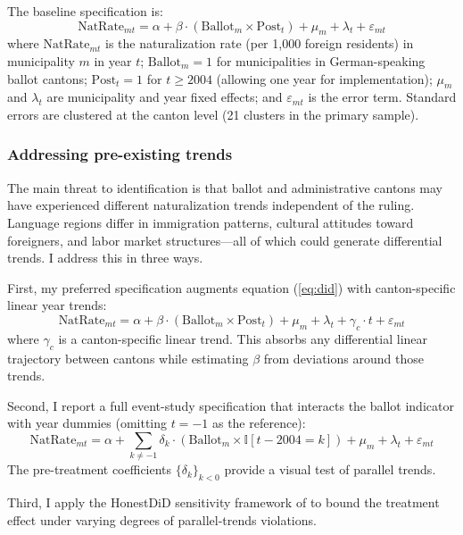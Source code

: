\documentclass[12pt]{article}
\newcommand{\ind}{\mathbb{I}}
\begin{document}
The baseline specification is:
\begin{equation}\label{eq:did}
\text{NatRate}_{mt} = \alpha + \beta \cdot (\text{Ballot}_m \times \text{Post}_t) + \mu_m + \lambda_t + \varepsilon_{mt}
\end{equation}
where $\text{NatRate}_{mt}$ is the naturalization rate (per 1,000 foreign residents) in municipality $m$ in year $t$; $\text{Ballot}_m = 1$ for municipalities in German-speaking ballot cantons; $\text{Post}_t = 1$ for $t \geq 2004$ (allowing one year for implementation); $\mu_m$ and $\lambda_t$ are municipality and year fixed effects; and $\varepsilon_{mt}$ is the error term. Standard errors are clustered at the canton level (21 clusters in the primary sample).

\subsubsection*{Addressing pre-existing trends} The main threat to identification is that ballot and administrative cantons may have experienced different naturalization trends independent of the ruling. Language regions differ in immigration patterns, cultural attitudes toward foreigners, and labor market structures---all of which could generate differential trends. I address this in three ways.

First, my preferred specification augments equation (\ref{eq:did}) with canton-specific linear year trends:
\begin{equation}\label{eq:did_trends}
\text{NatRate}_{mt} = \alpha + \beta \cdot (\text{Ballot}_m \times \text{Post}_t) + \mu_m + \lambda_t + \gamma_c \cdot t + \varepsilon_{mt}
\end{equation}
where $\gamma_c$ is a canton-specific linear trend. This absorbs any differential linear trajectory between cantons while estimating $\beta$ from deviations around those trends.

Second, I report a full event-study specification that interacts the ballot indicator with year dummies (omitting $t = -1$ as the reference):
\begin{equation}
\text{NatRate}_{mt} = \alpha + \sum_{k \neq -1} \delta_k \cdot (\text{Ballot}_m \times \ind[t - 2004 = k]) + \mu_m + \lambda_t + \varepsilon_{mt}
\end{equation}
The pre-treatment coefficients $\{\delta_k\}_{k<0}$ provide a visual test of parallel trends.

Third, I apply the HonestDiD sensitivity framework of \citet{rambachan2023} to bound the treatment effect under varying degrees of parallel-trends violations.
\end{document}

